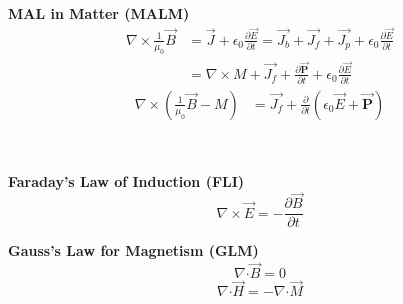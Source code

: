 \documentclass[12pt]{article}
\newcommand*{\dotP}{\boldsymbol \cdot}		%
\begin{document}
\begin{minipage}[t]{0.35\textwidth}
	\textbf{MAL in Matter (MALM)}
	\begin{align*}
		\nabla \times \frac{1}{\mu_0} \vec{B} &= \vec{J} + \epsilon_0 \frac{\partial \vec{E}}{\partial t}
			= \vec{J_b} + \vec{J_f} + \vec{J_p} + \epsilon_0 \frac{\partial \vec{E}}{\partial t} \\
		&= \nabla \times M + \vec{J_f} + \frac{\partial \vec{ \mathbf{P} }}{\partial t} 
			+ \epsilon_0 \frac{\partial \vec{E}}{\partial t}
	\end{align*}
	\begin{align*}
		\nabla \times \left( \frac{1}{\mu_0} \vec{B} - M \right)
			&= \vec{J_f} + \frac{\partial}{\partial t} \left( \epsilon_0 \vec{E} + \vec{ \mathbf{P} } \right)
	\end{align*}

	\hfill \break \\
\end{minipage}

\hfill \break
\begin{center}
\begin{minipage}[t]{0.35\textwidth}
	\textbf{Faraday's Law of Induction (FLI)}
	\[ \boxed{ \nabla \times \vec{E} = -\frac{\partial \vec{B}}{\partial t} } \]
	\hfill \break 
\end{minipage} 
\hspace{0.15\textwidth} 
\begin{minipage}[t]{0.35\textwidth}
	\textbf{Gauss's Law for Magnetism (GLM)}
	\[ \boxed{ \nabla \dotP \vec{B} = 0 } \]
	\[ \boxed{ \nabla \dotP \vec{H} = - \nabla \dotP \vec{M} } \]
\end{minipage} 
\end{center}

\newpage
\end{document}
